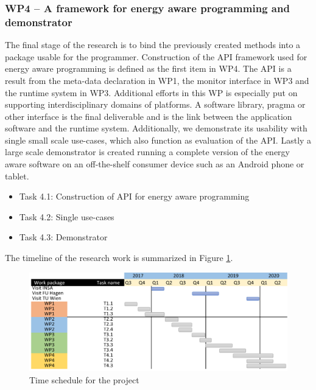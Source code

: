 \documentclass{article}
\begin{document}
\subsubsection{WP4 -- A framework for energy aware programming and demonstrator}
The final stage of the research is to bind the previously created methods into a package usable for the programmer.
Construction of the API framework used for energy aware programming is defined as the first item in WP4.
The API is a result from the meta-data declaration in WP1, the monitor interface in WP3 and the runtime system in WP3.
Additional efforts in this WP is especially put on supporting interdisciplinary domains of platforms.
A software library, pragma or other interface is the final deliverable and is the link between the application software and the runtime system.
Additionally, we demonstrate its usability with single small scale use-cases, which also function as evaluation of the API.
Lastly a large scale demonstrator is created running a complete version of the energy aware software on an off-the-shelf consumer device such as an Android phone or tablet.

\begin{itemize}
 \item Task 4.1: Construction of API for energy aware programming \vspace{-0.3cm}
 \item Task 4.2: Single use-cases \vspace{-0.3cm}
 \item Task 4.3: Demonstrator
\end{itemize}

The timeline of the research work is summarized in Figure \ref{fig:schedule}.
\begin{figure}[h]
	\centering
	\includegraphics[scale=0.45]{fig/schedule.png}
	\caption{Time schedule for the project}
	\label{fig:schedule}
\end{figure}
\end{document}
